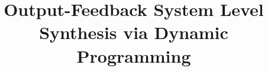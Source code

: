 \IEEEoverridecommandlockouts
\overrideIEEEmargins





\title{\LARGE \bf Output-Feedback System Level Synthesis via Dynamic Programming}
